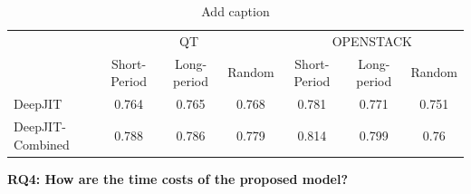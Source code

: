 \begin{table}[t!]
  \centering
  \caption{Add caption}
    \begin{tabular}{|l|c|c|c|c|c|c|}
    \toprule
    \multirow{2}[4]{*}{} & \multicolumn{3}{c|}{QT} & \multicolumn{3}{c|}{OPENSTACK} \\
\cmidrule{2-7}          & Short-Period & Long-period & Random & Short-Period & Long-period & Random \\
    \midrule
    DeepJIT & 0.764 & 0.765 & 0.768 & 0.781 & 0.771 & 0.751 \\
    \midrule
    DeepJIT-Combined & 0.788 & 0.786 & 0.779 & 0.814 & 0.799 & 0.76 \\
    \bottomrule
    \end{tabular}%
  \label{tab:addlabel}%
\end{table}%

\noindent \textbf{RQ4: How are the time costs of the proposed model?}


